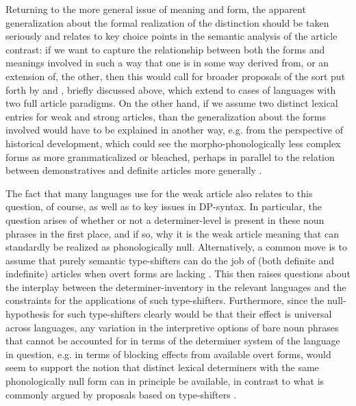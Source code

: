 \documentclass[output=paper
,modfonts
,nonflat]{langscibook}
\begin{document}
Returning to the more general issue of meaning and form, the apparent
generalization about the formal realization of the distinction should be
taken seriously and relates to key choice points in the semantic
analysis of the article contrast: if we want to capture the
relationship between both the forms and meanings involved in such a
way that one is in some way derived from, or an extension of, the
other, then this would call for broader proposals of the sort put
forth by \citet{Hanink2016} and \citet{Hanink2015}, briefly
discussed above, which extend
to cases of languages with two full article paradigms. On the other
hand, if we assume two distinct lexical entries for weak and strong
articles, than the generalization about the forms involved would have
to be explained in another way, e.g. from the perspective of
historical development, which could see the morpho-phonologically less
complex forms as more grammaticalized or
bleached, perhaps in parallel to the relation between demonstratives
and definite articles more generally \citep{Lyons1999}. 


The fact that many languages use  for the weak
article also relates to this question, of course, as well as to key
issues in DP-syntax. In particular, the question arises of whether or
not a determiner-level is present in these noun phrases in the first
place, and if so, why it is the weak article meaning that can
standardly be realized as phonologically null. Alternatively, a common
move is to assume that purely semantic type-shifters can do the job
of (both definite and indefinite) articles when overt forms are
lacking \citep{Partee1987,Chierchia1998,Dayal2004}. This then raises
questions about the interplay between the determiner-inventory in the
relevant languages and the constraints for the applications of such
type-shifters. Furthermore, since the null-hypothesis for such type-shifters clearly would be that their effect is universal across
languages, any variation in the interpretive options of bare noun
phrases that cannot be accounted for in terms of the determiner system
of the language in question, e.g. in terms of blocking effects from
available overt forms, would seem to support the notion that distinct
lexical determiners with the same phonologically null form can in
principle be available, in contrast to what is commonly argued by
proposals based on type-shifters \citep[for recent discussion,
see][]{Dayal2016}.\newpage
\end{document}
